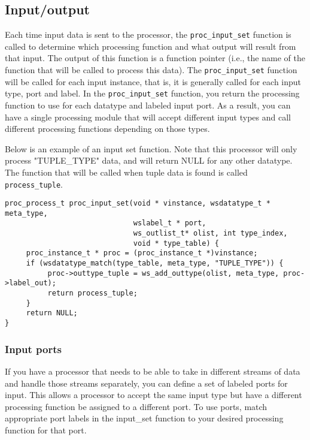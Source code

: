 \documentclass[11pt]{article}
\begin{document}
\subsection{Input/output}\label{sec:inputoutput}
Each time input data is sent to the processor, the 
\texttt{proc\_input\_set} function is called to determine which processing 
function and what output will result from that input.  The output of this 
function is a function pointer (i.e., the name of the function that will be
called to process this data).  The \texttt{proc\_input\_set} function will be 
called for each input instance, that is, it is generally called for each input 
type, port and label. In the \texttt{proc\_input\_set} function, you return the
processing function to use for each datatype and labeled input port.  As a 
result, you can have a single processing module that will accept different 
input types and call different processing functions depending on those types.

Below is an example of an input set function.  Note that this processor will 
only process "TUPLE\_TYPE" data, and will return NULL for any other datatype.  
The function that will be called when tuple data is found is called 
\texttt{process\_tuple}.

\begin{lstlisting}
proc_process_t proc_input_set(void * vinstance, wsdatatype_t * meta_type,
                              wslabel_t * port,
                              ws_outlist_t* olist, int type_index,
                              void * type_table) {
     proc_instance_t * proc = (proc_instance_t *)vinstance;
     if (wsdatatype_match(type_table, meta_type, "TUPLE_TYPE")) {
          proc->outtype_tuple = ws_add_outtype(olist, meta_type, proc->label_out);
          return process_tuple;
     }
     return NULL;
}
\end{lstlisting}

\subsubsection{Input ports}\label{sec:inputports}
If you have a processor that needs to be able to take in different streams of 
data and handle those streams separately, you can define a set of labeled ports
for input.  This allows a processor to accept the same input type but have a 
different processing function be assigned to a different port.  To use ports,
match appropriate port labels in the input\_set function to your desired 
processing function for that port.
\end{document}
